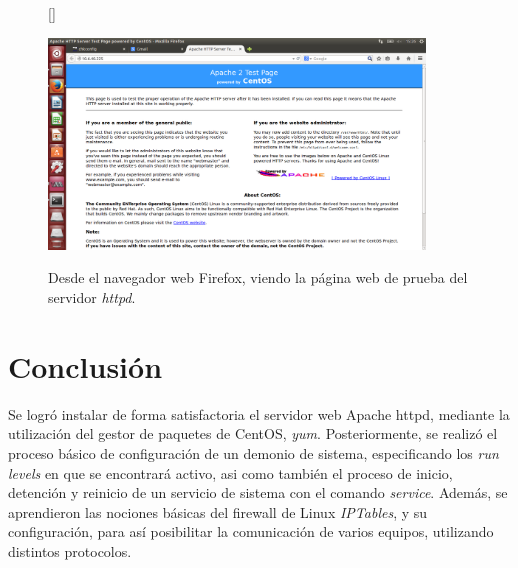 \documentclass[11pt]{article}
\begin{document}
\begin{figure}[ht]
[\FBwidth]
{\caption{Desde el navegador web Firefox, viendo la página web de prueba del servidor \textit{httpd}.}\label{fig:browserHostToMin}}
{\includegraphics[width=10cm]{screenshots/communication/host-browser-to-min.png}}
\end{figure}

\section{Conclusión}
Se logró instalar de forma satisfactoria el servidor web Apache httpd, mediante la utilización del gestor de paquetes de CentOS, \textit{yum}. Posteriormente, se realizó el proceso básico de configuración de un demonio de sistema, especificando los \textit{run levels} en que se encontrará activo, asi como también el proceso de inicio, detención y reinicio de un servicio de sistema con el comando \textit{service}. Además, se aprendieron las nociones básicas del firewall de Linux \textit{IPTables},  y su configuración, para así posibilitar la comunicación de varios equipos, utilizando distintos protocolos.
\end{document}

